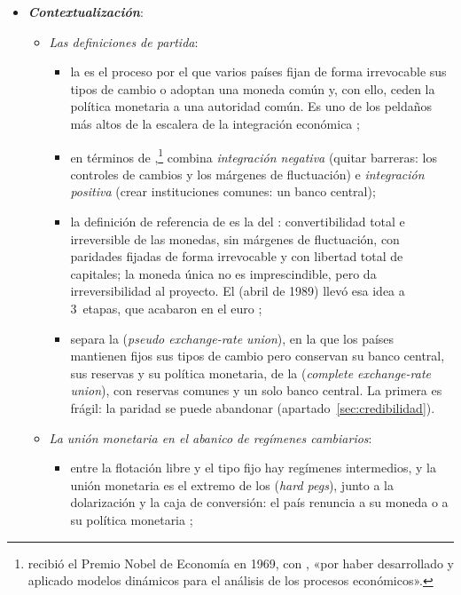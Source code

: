 \documentclass[11pt]{article}
\begin{document}
\begin{itemize}
\item \textbf{\emph{Contextualización}}:
  \begin{itemize}
  \item \emph{Las definiciones de partida}:
    \begin{itemize}
    \item la  es el proceso por el que varios países fijan de forma irrevocable sus tipos de cambio o adoptan una moneda común y, con ello, ceden la política monetaria a una autoridad común. Es uno de los peldaños más altos de la escalera de la integración económica ;
    \item en términos de \textcite{Tinbergen1954International},\footnote{ recibió el Premio Nobel de Economía en 1969, con , «por haber desarrollado y aplicado modelos dinámicos para el análisis de los procesos económicos»\nocite{Nobel1969}.} combina \emph{integración negativa} (quitar barreras: los controles de cambios y los márgenes de fluctuación) e \emph{integración positiva} (crear instituciones comunes: un banco central);
    \item la definición de referencia de  es la del : convertibilidad total e irreversible de las monedas, sin márgenes de fluctuación, con paridades fijadas de forma irrevocable y con libertad total de capitales; la moneda única no es imprescindible, pero da irreversibilidad al proyecto\nocite{Werner1970Informe}. El  (abril de 1989) llevó esa idea a 3~etapas, que acabaron en el euro\nocite{Delors1989Informe} ;
    \item \textcite{Corden1972Monetary} separa la  (\emph{pseudo exchange-rate union}), en la que los países mantienen fijos sus tipos de cambio pero conservan su banco central, sus reservas y su política monetaria, de la  (\emph{complete exchange-rate union}), con reservas comunes y un solo banco central. La primera es frágil: la paridad se puede abandonar (apartado~\ref{sec:credibilidad}).
    \end{itemize}
  \item \emph{La unión monetaria en el abanico de regímenes cambiarios}:
    \begin{itemize}
    \item entre la flotación libre y el tipo fijo hay regímenes intermedios, y la unión monetaria es el extremo de los  (\emph{hard pegs}), junto a la dolarización y la caja de conversión: el país renuncia a su moneda o a su política monetaria ;

\end{itemize}
\end{itemize}
\end{itemize}
\end{document}

